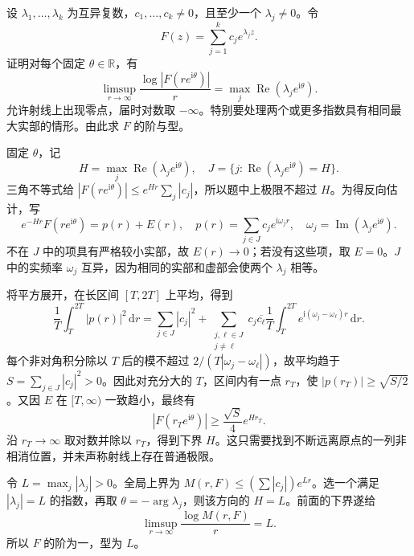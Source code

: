 \BookExercises

\begin{exercise}[有限指数和的方向增长]\label{b3:ex:19-draft-01}
设 \(\lambda_1,\ldots,\lambda_k\) 为互异复数，\(c_1,\ldots,c_k\ne0\)，且至少一个 \(\lambda_j\ne0\)。令
\[
 F(z)=\sum_{j=1}^kc_je^{\lambda_jz}.
\]
证明对每个固定 \(\theta\in\mathbb R\)，有
\[
 \limsup_{r\to\infty}\frac{\log|F(re^{\mathrm i\theta})|}{r}
 =\max_j\operatorname{Re}(\lambda_je^{\mathrm i\theta}).
\]
允许射线上出现零点，届时对数取 \(-\infty\)。特别要处理两个或更多指数具有相同最大实部的情形。由此求 \(F\) 的阶与型。
\end{exercise}
\begin{solution}
固定 \(\theta\)，记
\[
 H=\max_j\operatorname{Re}(\lambda_je^{\mathrm i\theta}),\quad
 J=\{j:\operatorname{Re}(\lambda_je^{\mathrm i\theta})=H\}.
\]
三角不等式给 \(|F(re^{\mathrm i\theta})|\le e^{Hr}\sum_j|c_j|\)，所以题中上极限不超过 \(H\)。为得反向估计，写
\[
 e^{-Hr}F(re^{\mathrm i\theta})=p(r)+E(r),\quad
 p(r)=\sum_{j\in J}c_je^{\mathrm i\omega_jr},\quad
 \omega_j=\operatorname{Im}(\lambda_je^{\mathrm i\theta}).
\]
不在 \(J\) 中的项具有严格较小实部，故 \(E(r)\to0\)；若没有这些项，取 \(E=0\)。\(J\) 中的实频率 \(\omega_j\) 互异，因为相同的实部和虚部会使两个 \(\lambda_j\) 相等。

将平方展开，在长区间 \([T,2T]\) 上平均，得到
\[
 \frac1T\int_T^{2T}|p(r)|^2\,\mathrm dr
 =\sum_{j\in J}|c_j|^2
 +\sum_{\substack{j,\ell\in J\\j\ne\ell}}
 c_j\overline{c_\ell}\frac1T\int_T^{2T}e^{\mathrm i(\omega_j-\omega_\ell)r}\,\mathrm dr.
\]
每个非对角积分除以 \(T\) 后的模不超过 \(2/(T|\omega_j-\omega_\ell|)\)，故平均趋于
\(S=\sum_{j\in J}|c_j|^2>0\)。因此对充分大的 \(T\)，区间内有一点 \(r_T\)，使 \(|p(r_T)|\ge\sqrt{S/2}\)。又因 \(E\) 在 \([T,\infty)\) 一致趋小，最终有
\[
 |F(r_Te^{\mathrm i\theta})|\ge\frac{\sqrt S}{4}e^{Hr_T}.
\]
沿 \(r_T\to\infty\) 取对数并除以 \(r_T\)，得到下界 \(H\)。这只需要找到不断远离原点的一列非相消位置，并未声称射线上存在普通极限。

令 \(L=\max_j|\lambda_j|>0\)。全局上界为 \(M(r,F)\le(\sum|c_j|)e^{Lr}\)。选一个满足 \(|\lambda_j|=L\) 的指数，再取 \(\theta=-\arg\lambda_j\)，则该方向的 \(H=L\)。前面的下界遂给
\[
 \limsup_{r\to\infty}\frac{\log M(r,F)}r=L.
\]
所以 \(F\) 的阶为一，型为 \(L\)。
\end{solution}

